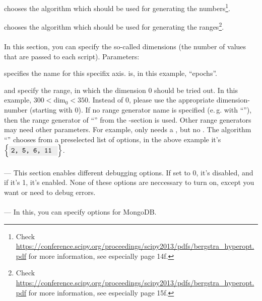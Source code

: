 \documentclass[]{scrartcl}
\begin{document}
 chooses the algorithm which should be used for generating the
numbers\footnote{Check \url{https://conference.scipy.org/proceedings/scipy2013/pdfs/bergstra_hyperopt.pdf}
for more information, see especially page 14f.}.

 chooses the algorithm which should be used for generating the ranges\footnote{Check \url{https://conference.scipy.org/proceedings/scipy2013/pdfs/bergstra_hyperopt.pdf}
for more information, see especially page 15f.}.

\paragraph{\ctexttt{[DIMENSIONS]}}

In this section, you can specify the so-called dimensions (the number of values that are passed to each script). Parameters:

 specifies the name for this specifix axis.  is, in this example, ``epochs''.

 and  specify the range, in which the dimension 0 should be tried out. In this example, $ 300 < \mathrm{dim_0} < 350 $.
Instead of $0$, please use the appropriate dimension-number (starting with 0). If no range generator name is specified 
(e.\,g. with ``''), then the range generator of ``''
from the \ctexttt{[DATA]}-section is used. Other range generators may need other parameters. For example,  only needs a , but no .
The algorithm ``'' chooses from a preselected list of options, in the above example it's $ \left\{\ctexttt{2, 5, 6, 11 }\right\} $.

\paragraph{\ctexttt{[DEBUG]}} --- This section enables different debugging options. If set to 0, it's disabled, and if it's 1, it's enabled.
None of these options are neccessary to turn on, except you want or need to debug errors.

\paragraph{\ctexttt{[MONGODB]}} --- In this, you can specify options for MongoDB. 
\end{document}
